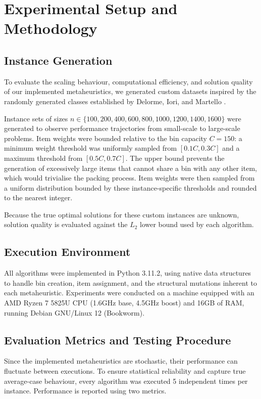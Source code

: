 \documentclass[11pt]{article}
\begin{document}
\section{Experimental Setup and Methodology \label{sec:experimental}}

\subsection{Instance Generation}
To evaluate the scaling behaviour, computational efficiency, and solution 
quality of our implemented metaheuristics, we generated custom datasets 
inspired by the randomly generated classes established by Delorme, Iori, 
and Martello \cite{BPPLIB}.

Instance sets of sizes $n \in \{100, 200, 400, 600, 800, 1000, 1200,
1400, 1600\}$ were generated to observe performance trajectories from
small-scale to large-scale problems. Item weights were bounded relative to the bin capacity $C = 150$: a minimum
weight threshold was uniformly sampled from $[0.1C, 0.3C]$ and a maximum
threshold from $[0.5C, 0.7C]$. The upper bound prevents the generation of
excessively large items that cannot share a bin with any other item, which would trivialise the
packing process. Item weights were then sampled from a uniform
distribution bounded by these instance-specific thresholds and rounded
to the nearest integer.

Because the true optimal solutions for these custom instances are unknown, 
solution quality is evaluated against the $L_2$ lower bound used by each 
algorithm.

\subsection{Execution Environment}
All algorithms were implemented in Python 3.11.2, using native data 
structures to handle bin creation, item assignment, and the structural 
mutations inherent to each metaheuristic. Experiments were conducted on a 
machine equipped with an AMD Ryzen 7 5825U CPU (1.6GHz base, 4.5GHz 
boost) and 16GB of RAM, running Debian GNU/Linux 12 (Bookworm).

\subsection{Evaluation Metrics and Testing Procedure}
Since the implemented metaheuristics are stochastic, their performance 
can fluctuate between executions. To ensure statistical reliability and 
capture true average-case behaviour, every algorithm was executed 5 
independent times per instance. Performance is reported using two 
metrics.
\end{document}
